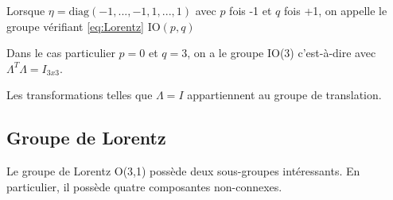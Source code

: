\begin{rmk}
Lorsque $\eta = \text{diag}(-1,...,-1,1,...,1)$ avec $p$ fois -1 et $q$ fois +1, on appelle le groupe vérifiant \ref{eq:Lorentz} IO$(p,q)$
    
\end{rmk}
\begin{rmk}
    Dans le cas particulier $p =0$ et $q=3$, on a le groupe IO(3) c'est-à-dire avec $\Lambda ^{T} \Lambda = I_{3x3}$. 
\end{rmk}

Les transformations telles que $\Lambda =  I$ appartiennent au groupe de translation.

\subsection{Groupe de Lorentz}

Le groupe de Lorentz O(3,1) possède deux sous-groupes intéressants. En particulier, il possède quatre composantes non-connexes.

